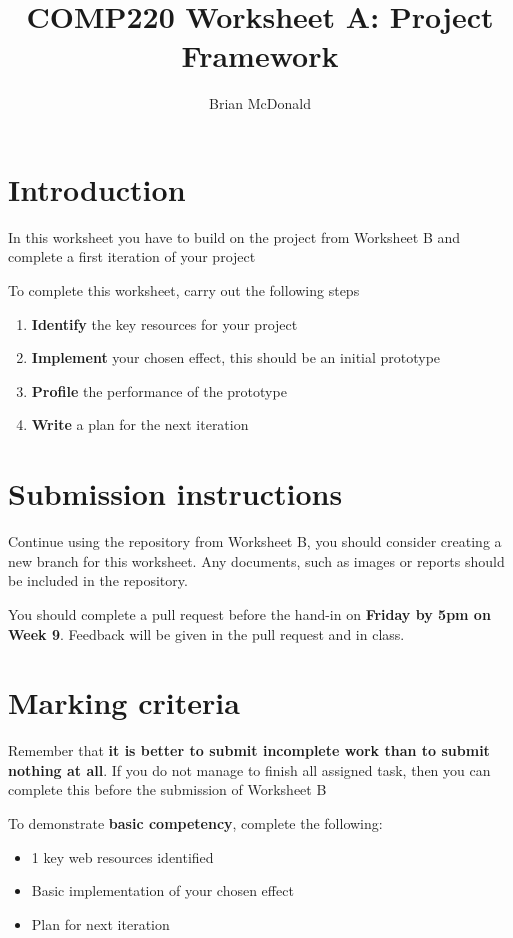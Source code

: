 \documentclass{../../../fal_assignment}
\title{COMP220 Worksheet A: Project Framework}
\author{Brian McDonald}
\begin{document}
\maketitle

\section*{Introduction}

In this worksheet you have to build on the project from Worksheet B and complete a first iteration of your project

To complete this worksheet, carry out the following steps
\begin{enumerate}[label=(\alph*)]
	\item \textbf{Identify} the key resources for your project
	\item \textbf{Implement} your chosen effect, this should be an initial prototype
	\item \textbf{Profile} the performance of the prototype
	\item \textbf{Write} a plan for the next iteration
\end{enumerate}

\section*{Submission instructions}

Continue using the repository from Worksheet B, you should consider creating a new branch for this worksheet. Any documents, such as images or reports should be included in the repository.

You should complete a pull request before the hand-in on \textbf{Friday by 5pm on Week 9}. Feedback will be given in the pull request and in class.

\section*{Marking criteria}

Remember that \textbf{it is better to submit incomplete work than to submit nothing at all}. If you do not manage to finish all assigned task, then you can complete this before the submission of Worksheet B

To demonstrate \textbf{basic competency}, complete the following:
\begin{itemize}
	\item 1 key web resources identified
	\item Basic implementation of your chosen effect
	\item Plan for next iteration
\end{itemize} 
\end{document}
